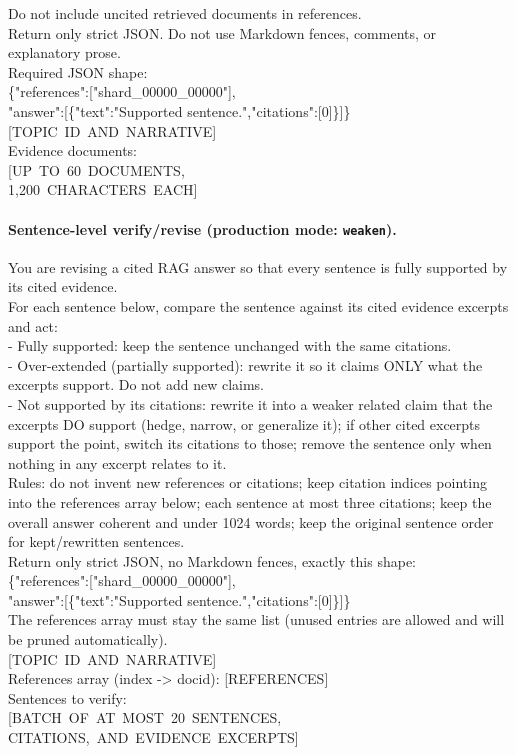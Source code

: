 Do not include uncited retrieved documents in references.\\
Return only strict JSON. Do not use Markdown fences, comments, or explanatory
prose.\\
Required JSON shape:\\
\{"references":["shard\_00000\_00000"],\\
"answer":[\{"text":"Supported sentence.","citations":[0]\}]\}\\
\mbox{[TOPIC ID AND NARRATIVE]}\\
Evidence documents:\\
\mbox{[UP TO 60 DOCUMENTS,}\\
\mbox{1,200 CHARACTERS EACH]}
\par\endgroup

\paragraph{Sentence-level verify/revise (production mode:
\texttt{weaken}).}

\begingroup
\footnotesize\ttfamily\raggedright
You are revising a cited RAG answer so that every sentence is fully supported
by its cited evidence.\\
For each sentence below, compare the sentence against its cited evidence
excerpts and act:\\
- Fully supported: keep the sentence unchanged with the same citations.\\
- Over-extended (partially supported): rewrite it so it claims ONLY what the
excerpts support. Do not add new claims.\\
- Not supported by its citations: rewrite it into a weaker related claim
that the excerpts DO support (hedge, narrow, or generalize it); if other
cited excerpts support the point, switch its citations to those; remove the
sentence only when nothing in any excerpt relates to it.\\
Rules: do not invent new references or citations; keep citation indices
pointing into the references array below; each sentence at most three
citations; keep the overall answer coherent and under 1024 words; keep the
original sentence order for kept/rewritten sentences.\\
Return only strict JSON, no Markdown fences, exactly this shape:\\
\{"references":["shard\_00000\_00000"],\\
"answer":[\{"text":"Supported sentence.","citations":[0]\}]\}\\
The references array must stay the same list (unused entries are allowed and
will be pruned automatically).\\
\mbox{[TOPIC ID AND NARRATIVE]}\\
References array (index -> docid): \mbox{[REFERENCES]}\\
Sentences to verify:\\
\mbox{[BATCH OF AT MOST 20 SENTENCES,}\\
\mbox{CITATIONS, AND EVIDENCE EXCERPTS]}
\par\endgroup

